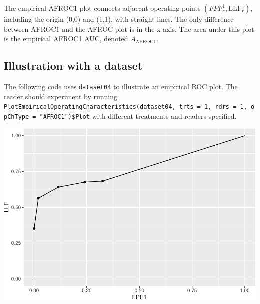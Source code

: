 \documentclass[
]{book}
\newenvironment{Shaded}{\begin{snugshade}}{\end{snugshade}}
\newcommand{\AttributeTok}[1]{\textcolor[rgb]{0.77,0.63,0.00}{#1}}
\newcommand{\DecValTok}[1]{\textcolor[rgb]{0.00,0.00,0.81}{#1}}
\newcommand{\FunctionTok}[1]{\textcolor[rgb]{0.00,0.00,0.00}{#1}}
\newcommand{\NormalTok}[1]{#1}
\newcommand{\OtherTok}[1]{\textcolor[rgb]{0.56,0.35,0.01}{#1}}
\newcommand{\SpecialCharTok}[1]{\textcolor[rgb]{0.00,0.00,0.00}{#1}}
\newcommand{\StringTok}[1]{\textcolor[rgb]{0.31,0.60,0.02}{#1}}
\begin{document}
The empirical AFROC1 plot connects adjacent operating points \(\left ( FPF_r^1, \text{LLF}_r \right )\), including the origin (0,0) and (1,1), with straight lines. The only difference between AFROC1 and the AFROC plot is in the x-axis. The area under this plot is the empirical AFROC1 AUC, denoted \(A_{\text{AFROC1}}\).

\hypertarget{froc-empirical-afroc1-plot-illustration}{%
\subsection{Illustration with a dataset}\label{froc-empirical-afroc1-plot-illustration}}

The following code uses \texttt{dataset04} to illustrate an empirical ROC plot. The reader should experiment by running \texttt{PlotEmpiricalOperatingCharacteristics(dataset04,\ trts\ =\ 1,\ rdrs\ =\ 1,\ opChType\ =\ "AFROC1")\$Plot} with different treatments and readers specified.

\begin{Shaded}
\end{Shaded}

\includegraphics{13a-froc-empirical1_files/figure-latex/unnamed-chunk-13-1.pdf}
\end{document}

